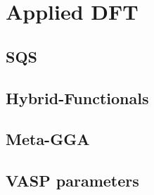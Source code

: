 \chapter{Applied DFT}
\label{sec:label4}


\section{SQS}
\section{Hybrid-Functionals}
\section{Meta-GGA}
\section{VASP parameters}

